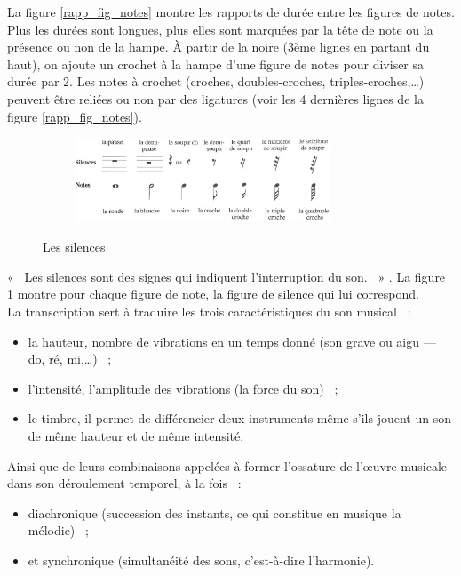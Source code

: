 La figure \ref{rapp_fig_notes} montre les rapports de durée entre les figures
de notes. Plus les durées sont longues, plus elles sont marquées par la tête de
note ou la présence ou non de la hampe. À partir de la noire (3ème lignes en
partant du haut), on ajoute un crochet à la hampe d’une figure de notes pour
diviser sa durée par 2. 
Les notes à crochet (croches, doubles-croches, triples-croches,…) 
peuvent être reliées ou non par des ligatures (voir les 4 dernières lignes de
la figure \ref{rapp_fig_notes}).\newpage
\begin{figure}[h]
	\centering
	\includegraphics[height=25mm, width=95mm]{
    z_images/3_methodes/0_notation_de_la_batterie/4_silences.png}
	\caption{Les silences}\cite{danhauser}
	\label{silences}
\end{figure}
«~ Les silences sont des signes qui indiquent l’interruption du son.~ »
\cite{danhauser}. La figure \ref{silences} montre pour chaque figure de note,
la figure de silence qui lui correspond.\\

La transcription sert à traduire les trois caractéristiques du son musical~ :
\begin{itemize}
	\item la hauteur, nombre de vibrations en un temps donné (son grave ou
        aigu — do, ré, mi,…)~ ;
	\item l’intensité, l’amplitude des vibrations (la force du son)~ ;
	\item le timbre, il permet de différencier deux instruments même s’ils
        jouent un son de même hauteur et de même intensité.
\end{itemize}

Ainsi que de leurs combinaisons appelées à former l’ossature de l’œuvre
musicale dans son déroulement temporel, à la fois~ :
\begin{itemize}
	\item diachronique (succession des instants, ce qui constitue en musique la
        mélodie)~ ;
	\item et synchronique (simultanéité des sons, c’est-à-dire l’harmonie).\\
\end{itemize}

